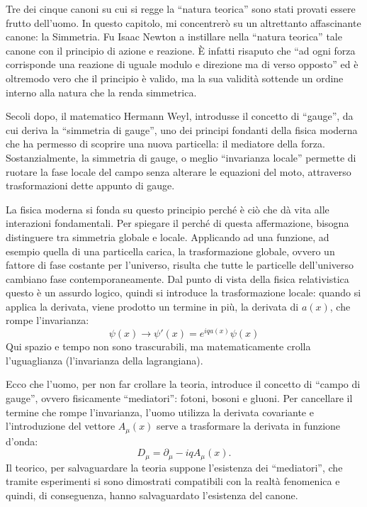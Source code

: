 \documentclass[11pt,a4paper]{article}
\begin{document}
Tre dei cinque canoni su cui si regge la “natura teorica” sono stati provati essere frutto dell’uomo. In questo capitolo, mi concentrerò su un altrettanto affascinante canone: la Simmetria. Fu Isaac Newton a instillare nella “natura teorica” tale canone con il principio di azione e reazione. È infatti risaputo che “ad ogni forza corrisponde una reazione di uguale modulo e direzione ma di verso opposto” ed è oltremodo vero che il principio è valido, ma la sua validità sottende un ordine interno alla natura che la renda simmetrica. 

Secoli dopo, il matematico Hermann Weyl, introdusse il concetto di “gauge”, da cui deriva la “simmetria di gauge”, uno dei principi fondanti della fisica moderna che ha permesso di scoprire una nuova particella: il mediatore della forza. Sostanzialmente, la simmetria di gauge, o meglio “invarianza locale” permette di ruotare la fase locale del campo senza alterare le equazioni del moto, attraverso trasformazioni dette appunto di gauge. 

La fisica moderna si fonda su questo principio perché è ciò che dà vita alle interazioni fondamentali. Per spiegare il perché di questa affermazione, bisogna distinguere tra simmetria globale e locale. Applicando ad una funzione, ad esempio quella di una particella carica, la trasformazione globale, ovvero un fattore di fase costante per l’universo, risulta che tutte le particelle dell’universo cambiano fase contemporaneamente. Dal punto di vista della fisica relativistica questo è un assurdo logico, quindi si introduce la trasformazione locale: quando si applica la derivata, viene prodotto un termine in più, la derivata di $a(x)$, che rompe l’invarianza: \begin{equation}\psi(x)\rightarrow\psi'(x)=e^{iqa(x)}\psi(x)\end{equation}Qui spazio e tempo non sono trascurabili, ma matematicamente crolla l’uguaglianza (l’invarianza della lagrangiana). 

Ecco che l’uomo, per non far crollare la teoria, introduce il concetto di “campo di gauge”, ovvero fisicamente “mediatori”: fotoni, bosoni e gluoni. Per cancellare il termine che rompe l’invarianza, l’uomo utilizza la derivata covariante e l’introduzione del vettore $A_\mu(x)$ serve a trasformare la derivata in funzione d’onda: \begin{equation}D_\mu=\partial_\mu-iqA_\mu(x).\end{equation}Il teorico, per salvaguardare la teoria suppone l’esistenza dei “mediatori”, che tramite esperimenti si sono dimostrati compatibili con la realtà fenomenica e quindi, di conseguenza, hanno salvaguardato l’esistenza del canone. 
\end{document}
